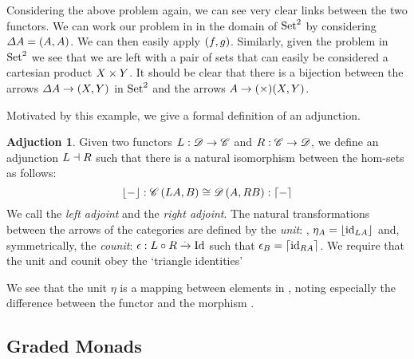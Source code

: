 Considering the above problem again, we can see very clear links between the two functors. We can work our problem in  in the domain of $\mathrm{Set}^2$ by considering $\mathnormal{\Delta} \mathnormal{A} = (\mathnormal{A}, \mathnormal{A})$. We can then easily apply $(\mathnormal{f}, \mathnormal{g})$. Similarly, given the problem in $\mathrm{Set}^2$ we see that we are left with a pair of sets that can easily be considered a cartesian product $\mathnormal{X} \times \mathnormal{Y}$. It should be clear that there is a bijection between the arrows $\mathnormal{\Delta} \mathnormal{A} \to (\mathnormal{X}, \mathnormal{Y})$ in $\mathrm{Set}^2$ and the arrows $\mathnormal{A} \to \mathnormal{(\times)} \mathnormal{(X, Y)}$.

\theoremstyle{definition}\newtheorem*{adjunctiondef}{Adjuction}
Motivated by this example, we give a formal definition of an adjunction.
\begin{adjunctiondef}
    Given two functors $\mathnormal{L}: \mathscr{D} \to \mathscr{C}$ and $\mathnormal{R}:
    \mathscr{C} \to \mathscr{D}$, we define an adjunction $\mathnormal{L} \dashv \mathnormal{R}$  such that there is a natural isomorphism between the
    hom-sets as follows:\cite{RelationalAlgebraByWayOfAdjunctions}
    \[
        \lfloor - \rfloor: \mathscr{C}\left(\mathnormal{L} \mathnormal{A}, B\right) \cong
        \mathscr{D}\left(A, \mathnormal{R} \mathnormal{B}\right) :\lceil - \rceil
    \]
    We call  the \emph{left adjoint} and  the \emph{right
    adjoint}.
    The natural transformations between the arrows of the categories are defined
    by the \emph{unit}: , $\eta_{A} =
    \lfloor \mathrm{id}_{\mathnormal{\mathnormal{L} \mathnormal{A}}} \rfloor$ and, symmetrically, the
    \emph{counit}:
    $\epsilon: \mathnormal{L \circ R} \xrightarrow{.} \mathnormal{\mathrm{Id}}$ such that
    $\epsilon_{B} = \lceil \mathrm{id}_{\mathnormal{\mathnormal{R} \mathnormal{A}}} \rceil$. We
    require that the unit and counit obey the `triangle identities' 
\end{adjunctiondef}

We see that the unit $\eta$ is a mapping between elements in , noting
especially the difference between the functor  and the
morphism .

\subsection{Graded Monads}\label{sec:gradedmonads}
